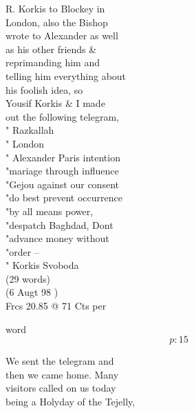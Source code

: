 \documentclass{report}
\begin{document}
	\par{
 	R. Korkis to Blockey in\ \\London, also the Bishop\ \\wrote to Alexander as well\ \\as his other friends \&\ \\reprimanding him and\ \\telling him everything about\ \\his foolish idea, so\ \\Yousif Korkis \& I made\ \\out the following telegram,\ \\" Razkallah\ \\" London\ \\" Alexander Paris intention\ \\"mariage through influence\ \\"Gejou against our consent\ \\"do best prevent occurrence\ \\"by all means power,\ \\"despatch Baghdad, Dont\ \\"advance money without\ \\"order –\ \\" Korkis Svoboda\ \\(29 words)\ \\(6 Augt 98 )\ \\Frcs 20.85 @ 71 Cts per\ \\
	}

	\par{
 	word\ \\
  \[p: 15 \]

	}



	\par{
 	We sent the telegram and\ \\then we came home. Many\ \\visitors called on us today\ \\being a Holyday of the Tejelly,\ \\
	}
\end{document}
